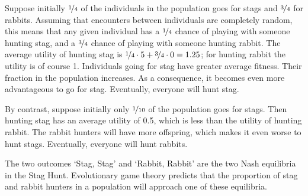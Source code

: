 Suppose initially $\nicefrac{1}{4}$ of the individuals in the population goes
for stags and $\nicefrac{3}{4}$ for rabbits. Assuming that encounters between
individuals are completely random, this means that any given individual has a
$\nicefrac{1}{4}$ chance of playing with someone hunting stag, and a
$\nicefrac{3}{4}$ chance of playing with someone hunting rabbit. The average
utility of hunting stag is
$\nicefrac{1}{4} \cdot 5 + \nicefrac{3}{4} \cdot 0 = 1.25$; for hunting rabbit
the utility is of course 1. Individuals going for stag have greater average
fitness. Their fraction in the population increases. As a consequence, it
becomes even more advantageous to go for stag. Eventually, everyone will hunt
stag.

By contrast, suppose initially only $\nicefrac{1}{10}$ of the population goes
for stags. Then hunting stag has an average utility of 0.5, which is less than
the utility of hunting rabbit. The rabbit hunters will have more offspring,
which makes it even worse to hunt stags. Eventually, everyone will hunt rabbits.

The two outcomes `Stag, Stag' and `Rabbit, Rabbit' are the two Nash equilibria
in the Stag Hunt. Evolutionary game theory predicts that the proportion of stag
and rabbit hunters in a population will approach one of these equilibria.



